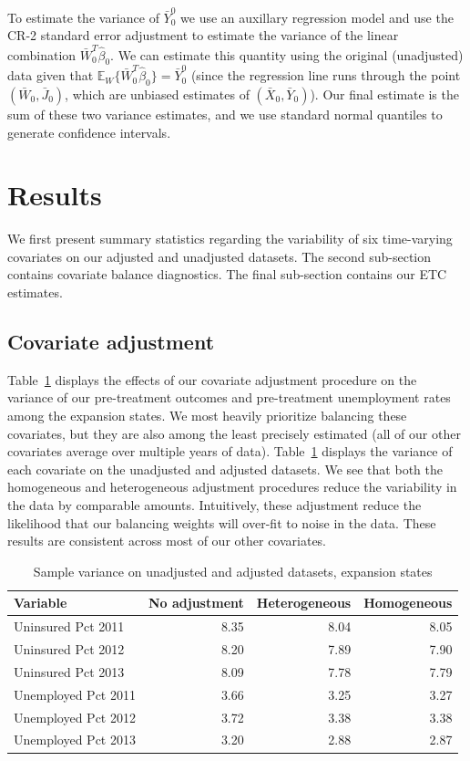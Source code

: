 \documentclass[aoas]{imsart}
\theoremstyle{plain}
\theoremstyle{remark}
\begin{document}
To estimate the variance of $\bar{Y}_0^0$ we use an auxillary regression model and use the CR-2 standard error adjustment to estimate the variance of the linear combination $\bar{W}_0^T\hat{\beta}_0$. We can estimate this quantity using the original (unadjusted) data given that $\mathbb{E}_W\{\bar{W}_0^T\hat{\beta}_0\} = \bar{Y}_0^0$ (since the regression line runs through the point $(\bar{W}_0, \bar{J}_0)$, which are unbiased estimates of $(\bar{X}_0, \bar{Y}_0)$). Our final estimate is the sum of these two variance estimates, and we use standard normal quantiles to generate confidence intervals. 

\section{Results}

We first present summary statistics regarding the variability of six time-varying covariates on our adjusted and unadjusted datasets. The second sub-section contains covariate balance diagnostics. The final sub-section contains our ETC estimates.

\subsection{Covariate adjustment}

Table~\ref{tab:adjust1} displays the effects of our covariate adjustment procedure on the variance of our pre-treatment outcomes and pre-treatment unemployment rates among the expansion states. We most heavily prioritize balancing these covariates, but they are also among the least precisely estimated (all of our other covariates average over multiple years of data). Table~\ref{tab:adjust1} displays the variance of each covariate on the unadjusted and adjusted datasets. We see that both the homogeneous and heterogeneous adjustment procedures reduce the variability in the data by comparable amounts. Intuitively, these adjustment reduce the likelihood that our balancing weights will over-fit to noise in the data. These results are consistent across most of our other covariates.

\begin{table}[ht]
\caption{Sample variance on unadjusted and adjusted datasets, expansion states}
\label{tab:adjust1}
\begin{tabular}{lrrr}
  \hline
Variable & No adjustment & Heterogeneous & Homogeneous \\ 
  \hline
Uninsured Pct 2011 & 8.35 & 8.04 & 8.05 \\ 
  Uninsured Pct 2012 & 8.20 & 7.89 & 7.90 \\ 
  Uninsured Pct 2013 & 8.09 & 7.78 & 7.79 \\ 
  Unemployed Pct 2011 & 3.66 & 3.25 & 3.27 \\ 
  Unemployed Pct 2012 & 3.72 & 3.38 & 3.38 \\ 
  Unemployed Pct 2013 & 3.20 & 2.88 & 2.87 \\ 
   \hline
\end{tabular}
\end{table}
\end{document}
